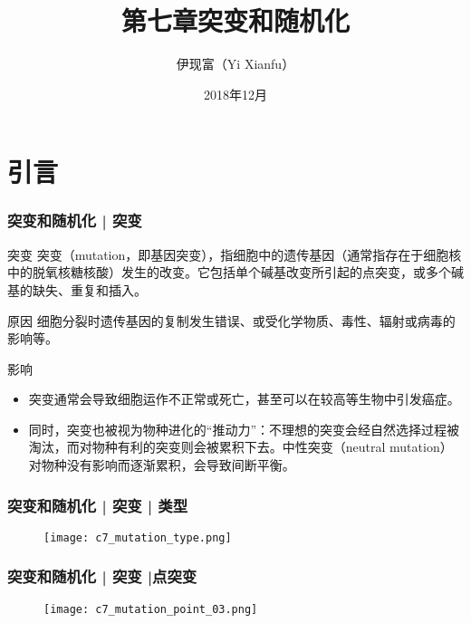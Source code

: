 


\title[突变和随机化]{第七章\quad 突变和随机化}
\author[Yixf]{伊现富（Yi Xianfu）}
\date{2018年12月}





\section{引言}
\begin{frame}
  \frametitle{突变和随机化 | 突变}
  \begin{block}{突变}
突变（mutation，即基因突变），指细胞中的遗传基因（通常指存在于细胞核中的脱氧核糖核酸）发生的改变。它包括单个碱基改变所引起的点突变，或多个碱基的缺失、重复和插入。
  \end{block}
  \pause
  \vspace{-0.5em}
  \begin{block}{原因}
    细胞分裂时遗传基因的复制发生错误、或受化学物质、毒性、辐射或病毒的影响等。
  \end{block}
  \pause
  \vspace{-0.5em}
  \begin{block}{影响}
    \begin{itemize}
      \item 突变通常会导致细胞运作不正常或死亡，甚至可以在较高等生物中引发癌症。
      \item 同时，突变也被视为物种进化的“推动力”：不理想的突变会经自然选择过程被淘汰，而对物种有利的突变则会被累积下去。中性突变（neutral mutation）对物种没有影响而逐渐累积，会导致间断平衡。
    \end{itemize}
  \end{block}
\end{frame}

\begin{frame}
  \frametitle{突变和随机化 | 突变 | 类型}
  \begin{figure}
    \centering
    \texttt{[image: c7\_mutation\_type.png]}
  \end{figure}
\end{frame}

\begin{frame}
  \frametitle{突变和随机化 | 突变 |点突变}
  \begin{figure}
    \centering
    \texttt{[image: c7\_mutation\_point\_03.png]}
  \end{figure}
\end{frame}

